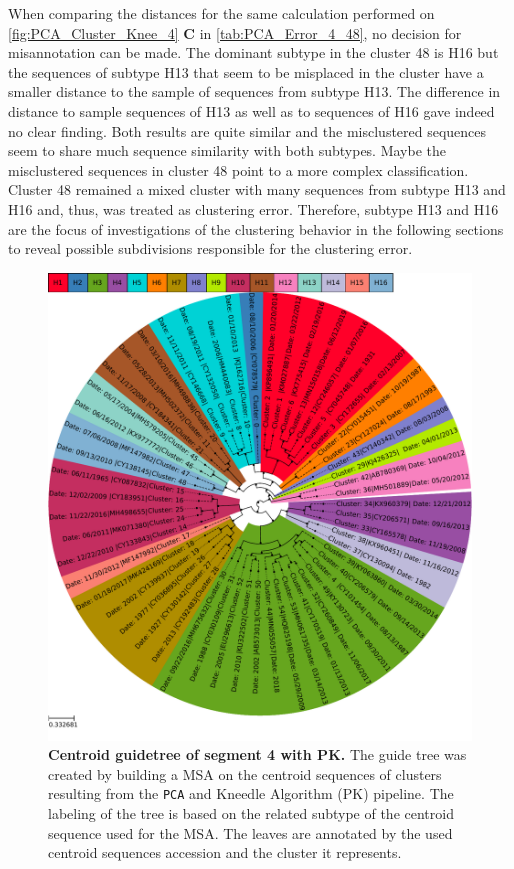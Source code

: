When comparing the distances for the same calculation performed on \autoref{fig:PCA_Cluster_Knee_4} \textbf{\textsf{C}} in \autoref{tab:PCA_Error_4_48}, no decision for misannotation can be made. The dominant subtype in the cluster 48 is H16 but the sequences of subtype H13 that seem to be misplaced in the cluster have a smaller distance to the sample of sequences from subtype H13. The difference in distance to sample sequences of H13 as well as to sequences of H16 gave indeed no clear finding. Both results are quite similar and the misclustered sequences seem to share much sequence similarity with both subtypes. Maybe the misclustered sequences in cluster 48 point to a more complex classification. Cluster 48 remained a mixed cluster with many sequences from subtype H13 and H16 and, thus, was treated as clustering error. Therefore, subtype H13 and H16 are the focus of investigations of the clustering behavior in the following sections to reveal possible subdivisions responsible for the clustering error.

\begin{figure}[!hbt]
    \centering
    \includegraphics[width=\textwidth]{PCA/Guidetree_segment_4_H_Centroid.pdf}
    \caption[Centroid guidetree of segment 4 with PK]{\textbf{Centroid guidetree of segment 4 with PK.} The guide tree was created by building a \gls{MSA} on the centroid sequences of clusters resulting from the \texttt{PCA} and Kneedle Algorithm (PK) pipeline. The labeling of the tree is based on the related subtype of the centroid sequence used for the \gls{MSA}. The leaves are annotated by the used centroid sequences accession and the cluster it represents.}
    \label{fig:PCA_Guidetree_Centroid_4}
\end{figure}

